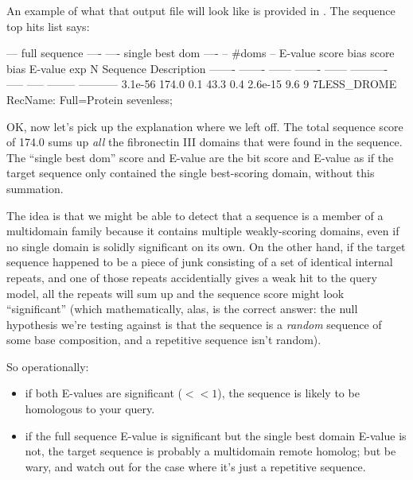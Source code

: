 An example of what that output file will look like is provided in
. The sequence top hits list says:

\begin{sreoutput}
  --- full sequence ----  ---- single best dom ----    -- #doms --
   E-value   score   bias    score   bias    E-value     exp     N  Sequence    Description
   ------- ------- ------  ------- ------ ----------   ----- -----  --------    -----------
   3.1e-56   174.0    0.1     43.3    0.4    2.6e-15     9.6     9  7LESS_DROME RecName: Full=Protein sevenless; 
\end{sreoutput}

OK, now let's pick up the explanation where we left off. The total
sequence score of 174.0 sums up \emph{all} the fibronectin III domains
that were found in the  sequence. The ``single best
dom'' score and E-value are the bit score and E-value as if the target
sequence only contained the single best-scoring domain, without this
summation.

The idea is that we might be able to detect that a sequence is a
member of a multidomain family because it contains multiple
weakly-scoring domains, even if no single domain is solidly
significant on its own.  On the other hand, if the target sequence
happened to be a piece of junk consisting of a set of identical
internal repeats, and one of those repeats accidentially gives a weak
hit to the query model, all the repeats will sum up and the sequence
score might look ``significant'' (which mathematically, alas, is the
correct answer: the null hypothesis we're testing against is that the
sequence is a \emph{random} sequence of some base composition, and a
repetitive sequence isn't random).

So operationally:
\begin{itemize}
\item if both E-values are significant ($<<1$), the sequence is likely
      to be homologous to your query.
\item if the full sequence E-value is significant but the single best domain
      E-value is not, the target sequence is probably a multidomain remote 
      homolog; but be wary, and watch out for the case where it's just a repetitive
      sequence.
\end{itemize}

